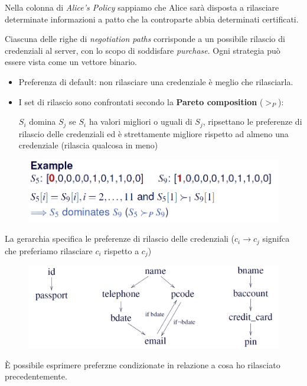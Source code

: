 \documentclass{report}
\begin{document}
Nella colonna di \textit{Alice's Policy} sappiamo che Alice sarà disposta a rilasciare determinate informazioni a patto che la controparte abbia determinati certificati.

\noindent Ciascuna delle righe di \textit{negotiation paths} corrisponde a un possibile rilascio di credenziali al server, con lo scopo di soddisfare \textit{purchase}.
Ogni strategia può essere vista come un vettore binario.

\begin{itemize}
    \item Preferenza di default: non rilasciare una credenziale è meglio che rilasciarla.
    \item I set di rilascio sono confrontati secondo la \textbf{Pareto composition} ($>_P$): 
    
    $ S_i $ domina $ S_j $ se $ S_i $ ha valori migliori o uguali di $ S_j $, ripsettano le preferenze di rilascio delle credenziali ed
    è strettamente migliore rispetto ad almeno una credenziale (rilascia qualcosa in meno)
\end{itemize}
\begin{figure}[ht]
    \centering
    \includegraphics[width=0.85\linewidth]{images/Pareto.png}
\end{figure}

La gerarchia specifica le preferenze di rilascio delle credenziali ($c_i \rightarrow c_j$ signifca che preferiamo rilasciare $ c_i $ rispetto a $ c_j$)
\begin{figure}[ht]
    \centering
    \includegraphics[width=0.85\linewidth]{images/Gerarchia.png}
\end{figure}

È possibile esprimere preferzne condizionate in relazione a cosa ho rilasciato precedentemente.
\end{document}
